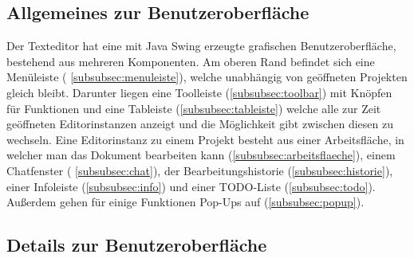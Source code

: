 \documentclass{scrartcl}
\begin{document}
\subsection{Allgemeines zur Benutzeroberfläche}
Der Texteditor hat eine mit Java Swing erzeugte grafischen Benutzeroberfläche, bestehend aus mehreren Komponenten. Am oberen Rand befindet sich eine Menüleiste ( \ref{subsubsec:menuleiste}), welche unabhängig von geöffneten Projekten gleich bleibt. Darunter liegen eine Toolleiste (\ref{subsubsec:toolbar}) mit Knöpfen für Funktionen und eine Tableiste (\ref{subsubsec:tableiste}) welche alle zur Zeit geöffneten Editorinstanzen anzeigt und die Möglichkeit gibt zwischen diesen zu wechseln. Eine Editorinstanz zu einem Projekt besteht aus einer Arbeitsfläche, in welcher man das Dokument bearbeiten kann (\ref{subsubsec:arbeitsflaeche}), einem Chatfenster ( \ref{subsubsec:chat}), der Bearbeitungshistorie (\ref{subsubsec:historie}), einer Infoleiste (\ref{subsubsec:info}) und einer TODO-Liste (\ref{subsubsec:todo}). Außerdem gehen für einige Funktionen Pop-Ups auf (\ref{subsubsec:popup}).

\subsection{Details zur Benutzeroberfläche}
\end{document}
